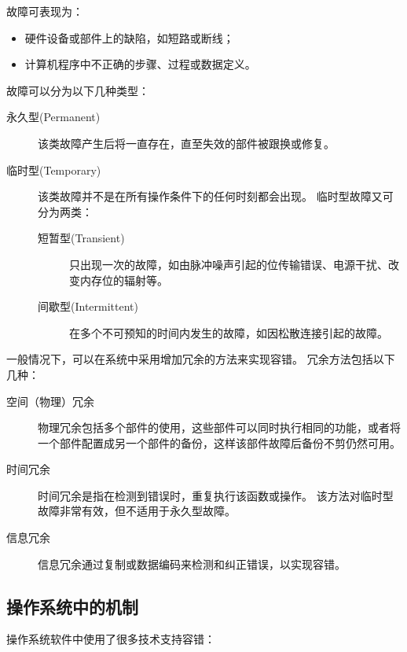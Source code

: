 {{        故障可表现为：

        \begin{itemize}
            \item 硬件设备或部件上的缺陷，如短路或断线；
            \item 计算机程序中不正确的步骤、过程或数据定义。
        \end{itemize}

        故障可以分为以下几种类型：

        \begin{description}
            \item[永久型(Permanent)] 该类故障产生后将一直存在，直至失效的部件被跟换或修复。
            \item[临时型(Temporary)]
            {
                该类故障并不是在所有操作条件下的任何时刻都会出现。
                临时型故障又可分为两类：

                \begin{description}
                    \item[短暂型(Transient)] 只出现一次的故障，如由脉冲噪声引起的位传输错误、电源干扰、改变内存位的辐射等。
                    \item[间歇型(Intermittent)] 在多个不可预知的时间内发生的故障，如因松散连接引起的故障。
                \end{description}
            }
        \end{description}

        一般情况下，可以在系统中采用增加冗余的方法来实现容错。
        冗余方法包括以下几种：

        \begin{description}
            \item[空间（物理）冗余] 物理冗余包括多个部件的使用，这些部件可以同时执行相同的功能，或者将一个部件配置成另一个部件的备份，这样该部件故障后备份不剪仍然可用。
            \item[时间冗余]
            {
                时间冗余是指在检测到错误时，重复执行该函数或操作。
                该方法对临时型故障非常有效，但不适用于永久型故障。
            }
            \item[信息冗余] 信息冗余通过复制或数据编码来检测和纠正错误，以实现容错。
        \end{description}
    }

    \subsection{操作系统中的机制}
    {
        操作系统软件中使用了很多技术支持容错：

}}
